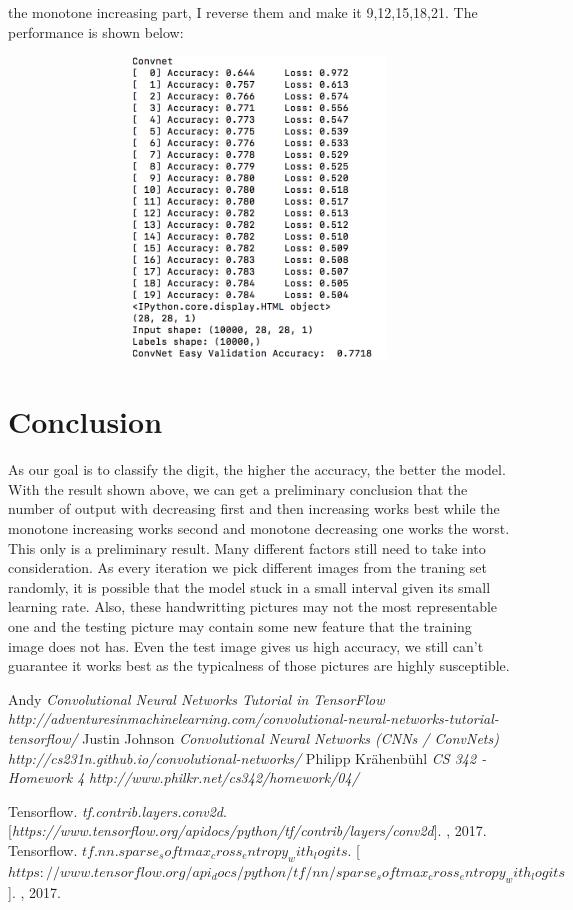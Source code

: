 \documentclass[a4paper,10pt]{article}
\begin{document}
	 the monotone increasing part, I reverse them and make it 9,12,15,18,21.
	 The performance is shown below:
	 \par
	 	\includegraphics[width=135mm,height=80mm]{increase.png}
	 
	
\section{Conclusion}
As our goal is to classify the digit, the higher the accuracy, the better the model. With the result shown above,  we can get a preliminary conclusion that the number of output with decreasing first and then increasing works best while the monotone increasing works second and monotone decreasing one works the worst. This only is a preliminary result. Many different factors still need to take into consideration. As every iteration we pick different images from the traning set randomly, it is possible that the model stuck in a small interval given its small learning rate. Also, these handwritting pictures may not the most representable one and the testing picture may contain some new feature that the training image does not has. Even the test image gives us high accuracy, we still can't guarantee it works best as the typicalness of those pictures are highly susceptible.
\begin{thebibliography}{9}
	Andy 
	\textit{Convolutional Neural Networks Tutorial in TensorFlow}
	\textit{http://adventuresinmachinelearning.com/convolutional-neural-networks-tutorial-tensorflow/}
	Justin Johnson
	\textit{Convolutional Neural Networks (CNNs / ConvNets)}
	\textit{http://cs231n.github.io/convolutional-networks/}
	Philipp Krähenbühl
	\textit{CS 342 - Homework 4}
	\textit{http://www.philkr.net/cs342/homework/04/}
	
	
	Tensorflow. 
	\textit{tf.contrib.layers.conv2d}. [\textit{https://www.tensorflow.org/apidocs/python/tf/contrib/layers/conv2d}]. 
	, 2017.
	Tensorflow. 
	\textit{$tf.nn.sparse_softmax_cross_entropy_with_logits$}. [\textit{$https://www.tensorflow.org/api_docs/python/tf/nn/sparse_softmax_cross_entropy_with_logits$}]. 
	, 2017.
	
	
	
\end{thebibliography}
\end{document}
